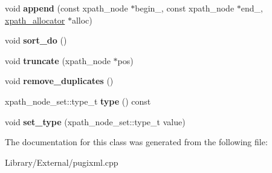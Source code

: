 \begin{DoxyCompactItemize}
\item 
\hypertarget{classxpath__node__set__raw_a0c02728de3d895a2d12df9666d60e414}{}void {\bfseries append} (const xpath\+\_\+node $\ast$begin\+\_\+, const xpath\+\_\+node $\ast$end\+\_\+, \hyperlink{classxpath__allocator}{xpath\+\_\+allocator} $\ast$alloc)\label{classxpath__node__set__raw_a0c02728de3d895a2d12df9666d60e414}

\item 
\hypertarget{classxpath__node__set__raw_a5e46ee306afc24ea83f6c1181bba3600}{}void {\bfseries sort\+\_\+do} ()\label{classxpath__node__set__raw_a5e46ee306afc24ea83f6c1181bba3600}

\item 
\hypertarget{classxpath__node__set__raw_aba48d228f554065702f3e6d5059f701d}{}void {\bfseries truncate} (xpath\+\_\+node $\ast$pos)\label{classxpath__node__set__raw_aba48d228f554065702f3e6d5059f701d}

\item 
\hypertarget{classxpath__node__set__raw_af82da6fa8d42f9dff9c55e7b93d96e26}{}void {\bfseries remove\+\_\+duplicates} ()\label{classxpath__node__set__raw_af82da6fa8d42f9dff9c55e7b93d96e26}

\item 
\hypertarget{classxpath__node__set__raw_a9c1dceb2d9a8e0747380bd12968fc9d8}{}xpath\+\_\+node\+\_\+set\+::type\+\_\+t {\bfseries type} () const \label{classxpath__node__set__raw_a9c1dceb2d9a8e0747380bd12968fc9d8}

\item 
\hypertarget{classxpath__node__set__raw_ae73780271d772967f78ddd7b9376cdab}{}void {\bfseries set\+\_\+type} (xpath\+\_\+node\+\_\+set\+::type\+\_\+t value)\label{classxpath__node__set__raw_ae73780271d772967f78ddd7b9376cdab}

\end{DoxyCompactItemize}


The documentation for this class was generated from the following file\+:\begin{DoxyCompactItemize}
\item 
Library/\+External/pugixml.\+cpp\end{DoxyCompactItemize}
